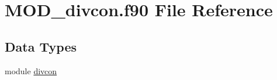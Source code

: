 \hypertarget{MOD__divcon_8f90}{\section{M\-O\-D\-\_\-divcon.\-f90 File Reference}
\label{MOD__divcon_8f90}
}
\subsection*{Data Types}
\begin{DoxyCompactItemize}
\item 
module \hyperlink{classdivcon}{divcon}
\end{DoxyCompactItemize}
